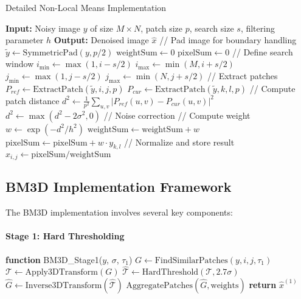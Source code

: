 \documentclass[12pt]{article}
\begin{document}
\begin{algorithm}
    \caption{Detailed Non-Local Means Implementation}
    \begin{algorithmic}[1]
        \STATE \textbf{Input:} Noisy image $y$ of size $M \times N$, patch size $p$, search size $s$, filtering parameter $h$
        \STATE \textbf{Output:} Denoised image $\hat{x}$
        \STATE
        \STATE // Pad image for boundary handling
        \STATE $\tilde{y} \leftarrow \text{SymmetricPad}(y, p/2)$
        \STATE
        \STATE $\text{weightSum} \leftarrow 0$
        \STATE $\text{pixelSum} \leftarrow 0$
        \STATE
        \STATE // Define search window
        \STATE $i_{\min} \leftarrow \max(1, i - s/2)$
        \STATE $i_{\max} \leftarrow \min(M, i + s/2)$
        \STATE $j_{\min} \leftarrow \max(1, j - s/2)$
        \STATE $j_{\max} \leftarrow \min(N, j + s/2)$
        \STATE
        \STATE // Extract patches
        \STATE $P_{ref} \leftarrow \text{ExtractPatch}(\tilde{y}, i, j, p)$
        \STATE $P_{cur} \leftarrow \text{ExtractPatch}(\tilde{y}, k, l, p)$
        \STATE
        \STATE // Compute patch distance
        \STATE $d^2 \leftarrow \frac{1}{p^2} \sum_{u,v} |P_{ref}(u,v) - P_{cur}(u,v)|^2$
        \STATE $d^2 \leftarrow \max(d^2 - 2\sigma^2, 0)$ // Noise correction
        \STATE
        \STATE // Compute weight
        \STATE $w \leftarrow \exp(-d^2/h^2)$
        \STATE $\text{weightSum} \leftarrow \text{weightSum} + w$
        \STATE $\text{pixelSum} \leftarrow \text{pixelSum} + w \cdot y_{k,l}$
        \ENDFOR
        \ENDFOR
        \STATE
        \STATE // Normalize and store result
        \STATE $\hat{x}_{i,j} \leftarrow \text{pixelSum} / \text{weightSum}$
        \ENDFOR
        \ENDFOR
    \end{algorithmic}
\end{algorithm}

\subsection{BM3D Implementation Framework}
\label{subsec:bm3d_framework_impl}

The BM3D implementation involves several key components:

\paragraph{Stage 1: Hard Thresholding}
\begin{algorithmic}[1]
    \STATE \textbf{function} BM3D\_Stage1($y$, $\sigma$, $\tau_1$)
    \STATE $G \leftarrow \text{FindSimilarPatches}(y, i, j, \tau_1)$
    \STATE $\mathcal{T} \leftarrow \text{Apply3DTransform}(G)$
    \STATE $\hat{\mathcal{T}} \leftarrow \text{HardThreshold}(\mathcal{T}, 2.7\sigma)$
    \STATE $\hat{G} \leftarrow \text{Inverse3DTransform}(\hat{\mathcal{T}})$
    \STATE $\text{AggregatePatches}(\hat{G}, \text{weights})$
    \ENDFOR
    \STATE \textbf{return} $\hat{x}^{(1)}$
\end{algorithmic}
\end{document}
